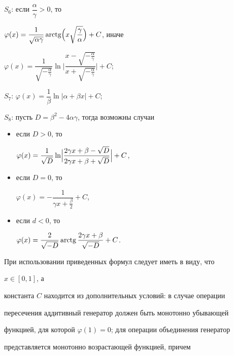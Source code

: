 $S_6$: если $\dfrac{\alpha}{\gamma}>0$, то


$\varphi(x)=\dfrac{1}{\sqrt{\alpha\gamma}}


\arctg\Bigl(x\sqrt{\dfrac{\gamma}{\alpha}}\Bigr)+C$, иначе


$\varphi(x)=\dfrac{1}{\sqrt{-\frac{\alpha}{\gamma}}}\ln


\Biggl|\dfrac{x-\sqrt{-\frac{\alpha}{\gamma}}}


{x+\sqrt{-\frac{\alpha}{\gamma}}}\Biggr|+C$;





$S_7$: $\varphi(x)=\dfrac{1}{\beta}\ln|\alpha+\beta x|+C$;





$S_8$: пусть $D=\beta^2-4\alpha\gamma$, тогда возможны случаи


\begin{itemize}


\item[\ ] если $D>0$, то


$\varphi(x)=\dfrac{1}{\sqrt D}\ln\Bigl|


\dfrac{2\gamma x+\beta-\sqrt D}


{2\gamma x+\beta+\sqrt D}\Bigr|+C$,\\


\item[\ ] если $D=0$, то


$\varphi(x)=-\dfrac{1}{\gamma x+\frac{\beta}{2}}+C$,\\


\item[\ ] если $d<0$, то


$\varphi(x)=\dfrac{2}{\sqrt{-D}}\arctg


\dfrac{2\gamma x+\beta}{\sqrt{-D}}+C$.


\end{itemize}





При использовании приведенных формул следует иметь в виду, что


$x\in[0,1]$, а


константа $C$ находится из дополнительных условий: в случае операции


пересечения аддитивный генератор должен быть монотонно убывающей


функцией, для которой $\varphi(1)=0$; для операции объединения генератор


представляется монотонно возрастающей функцией, причем


